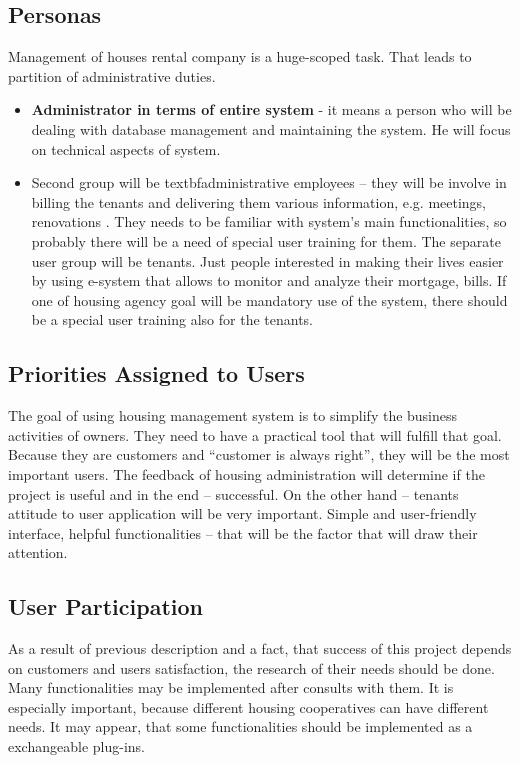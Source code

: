 \documentclass[a4paper,11pt,onecolumn,oneside]{book}
\begin{document}
\subsection{Personas}

Management of houses rental company is a huge-scoped task.  That leads to partition of administrative duties. 
\begin{itemize}
\item \textbf{Administrator in terms of entire system} - it means a person who will be dealing with database management and maintaining the system. He will focus on technical aspects of system.
\item Second group will be textbf{administrative employees} – they will be involve in billing the tenants and delivering them various information, e.g. meetings, renovations . They needs to be familiar with system’s main functionalities, so probably there will be a need of special user training for them.
The separate user group will be tenants. Just people interested in making their lives easier by using e-system that allows to monitor and analyze their mortgage, bills. If one of housing agency goal will be mandatory use of the system, there should be a special user training also for the tenants.
\end{itemize}


\subsection{Priorities Assigned to Users}

The goal of using housing management system is to simplify the business activities of owners. They need to have a practical tool that will fulfill that goal. Because they are customers and “customer is always right”, they will be the most important users. The feedback of housing administration will determine if the project is useful and in the end – successful.
On the other hand – tenants attitude to user application will be very important. Simple and user-friendly interface, helpful functionalities – that will be the factor that will draw their attention.


\subsection{User Participation}

As a result of previous description and a fact, that success of this project depends on customers and users satisfaction, the research of their needs should be done. Many functionalities may be implemented after consults with them.
It is especially important, because different housing cooperatives can have different needs. It may appear, that some functionalities should be implemented as a exchangeable plug-ins.
\end{document}
